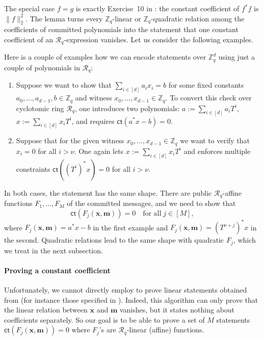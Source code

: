 \documentclass[../../book.tex]{subfiles}
\begin{document}
The special case $f = g$ is exactly Exercise~10 in : the constant coefficient of $f^{\ast}f$ is $\|f\|_2^2$.
The lemma turns every $\mathbb{Z}_q$-linear or $\mathbb{Z}_q$-quadratic relation among the coefficients of committed polynomials into the statement that one constant coefficient of an $\mathcal{R}_q$-expression vanishes.
Let us consider the following examples.
\begin{example}\label{ex:linear-ct-constraints}
    Here is a couple of examples how we can encode statements over $\mathbb{Z}_q^d$ using just a couple of polynomials in $\mathcal{R}_q$:
    \begin{enumerate}
        \item Suppose we want to show that $\sum_{i \in [d]}a_ix_i = b$ for some fixed constants $a_0,\dots,a_{d-1},b \in \mathbb{Z}_q$ and witness $x_0,\dots,x_{d-1} \in \mathbb{Z}_q$.
        To convert this check over cyclotomic ring $\mathcal{R}_q$, one introduces two polynomials: $a := \sum_{i \in [d]}a_iT^i$, $x := \sum_{i \in [d]} x_iT^i$, and requires $\mathsf{ct}(a^*x-b) = 0$.
        \item Suppose that for the given witness $x_0,\dots,x_{d-1} \in \mathbb{Z}_q$ we want to verify that $x_i=0$ for all $i>\nu$. 
        One again lets $x := \sum_{i \in [d]}x_iT^i$ and enforces multiple constraints $\mathsf{ct}((T^i)^*x)=0$ for all $i>\nu$.
    \end{enumerate}
\end{example}

In both cases, the statement has the same shape.
There are public $\mathcal{R}_q$-affine functions $F_1, \dots, F_M$ of the committed messages, and we need to show that
\begin{equation*}
    \mathsf{ct}(F_j(\mathbf{x}, \mathbf{m})) = 0 \quad \text{for all} \; j \in [M],
\end{equation*}
where $F_j(\mathbf{x}, \mathbf{m}) = a^{\ast}x - b$ in the first example and $F_j(\mathbf{x}, \mathbf{m}) = (T^{\nu+j})^{\ast}x$ in the second.
Quadratic relations lead to the same shape with quadratic $F_j$, which we treat in the next subsection.

\paragraph{Proving a constant coefficient}
Unfortunately, we cannot directly employ  to prove linear statements obtained from  (for instance those specified in ).
Indeed, this algorithm can only prove that the linear relation between $\mathbf{x}$ and $\mathbf{m}$ vanishes, but it states nothing about coefficients separately.
So our goal is to be able to prove a set of $M$ statements $\mathsf{ct}(F_j(\mathbf{x}, \mathbf{m})) = 0$ where $F_j$'s are $\mathcal{R}_q$-linear (affine) functions. 
\end{document}
